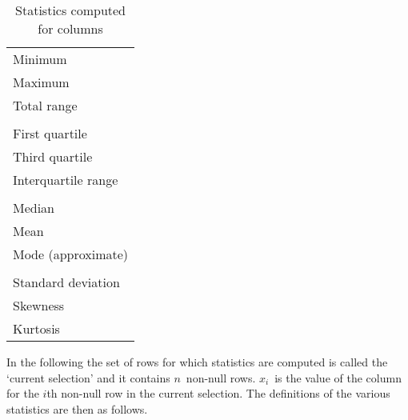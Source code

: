 \documentclass[twoside,11pt]{article}
\renewcommand{\_}{\texttt{\symbol{95}}}
\begin{document}
\begin{table}[htbp]

\begin{center}
\begin{tabular}{l}
Minimum             \\
Maximum             \\
Total range         \\
  \\
First quartile      \\
Third quartile      \\
Interquartile range \\
  \\
Median              \\
Mean                \\
Mode (approximate)  \\
  \\
Standard deviation  \\
Skewness            \\
Kurtosis            \\
\end{tabular}
\end{center}

\caption{Statistics computed for columns
\label{STATT} }

\end{table}

In the following the set of rows for which statistics are computed is
called the `current selection' and it contains $n$\, non-null rows.
$x_{i}$\, is the value of the column for the $i$th non-null row in the
current selection.  The definitions of the various statistics are then as
follows.
\end{document}
